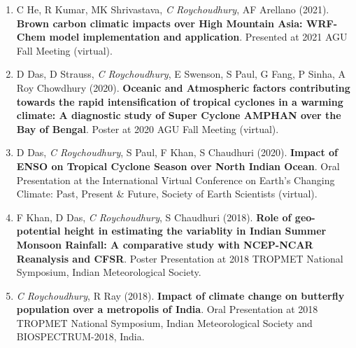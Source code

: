 \documentclass[margin,line]{resume}
\begin{document}
\begin{resume}
\begin{enumerate}[topsep=1pt, partopsep=1pt, itemsep=0.5pt, parsep=0.1pt, leftmargin=15pt,label=\arabic*.]
			\item C He, R Kumar, MK Shrivastava, \textit{C Roychoudhury}, AF Arellano (2021).
			\textbf{Brown carbon climatic impacts over High Mountain Asia: WRF-Chem model implementation and application}.
			Presented at 2021 AGU Fall Meeting (virtual).
			
			\item D Das, D Strauss, \textit{C Roychoudhury}, E Swenson, S Paul, G Fang, P Sinha, A Roy Chowdhury (2020).
			\textbf{Oceanic and Atmospheric factors contributing towards the rapid intensification of tropical cyclones in a warming climate: A diagnostic study of Super Cyclone AMPHAN over the Bay of Bengal}.
			Poster at 2020 AGU Fall Meeting (virtual).
			
			\item D Das, \textit{C Roychoudhury}, S Paul, F Khan, S Chaudhuri (2020). \textbf{Impact of ENSO on Tropical Cyclone Season over North Indian Ocean}. Oral Presentation at the International Virtual Conference on Earth's Changing Climate: Past, Present \& Future, Society of Earth Scientists (virtual).
			
			\item F Khan, D Das, \textit{C Roychoudhury}, S Chaudhuri (2018).		\textbf{Role of geo-potential height in estimating the variablity in Indian Summer Monsoon Rainfall: A comparative study with NCEP-NCAR Reanalysis and CFSR}. Poster Presentation at  %
			2018 TROPMET National Symposium, Indian Meteorological Society.
			
			\item \textit{C Roychoudhury}, R Ray (2018).
			\textbf{Impact of climate change on butterfly population over a metropolis of India}.
				Oral Presentation at %
				2018 TROPMET National Symposium, Indian Meteorological Society and BIOSPECTRUM-2018, India.
				
				

\end{enumerate}
\end{resume}
\end{document}
